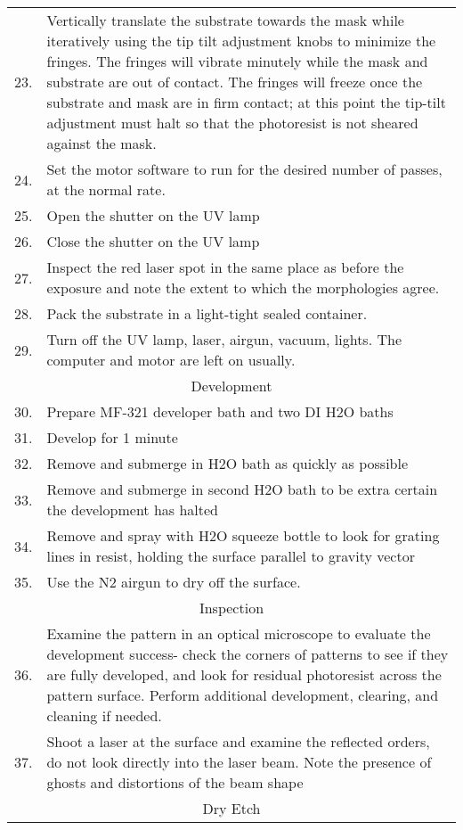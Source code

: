 \begin{longtable}{cp{15cm}}
23.&Vertically translate the substrate towards the mask while iteratively using the tip tilt adjustment knobs to minimize the fringes.  The fringes will vibrate minutely while the mask and substrate are out of contact.  The fringes will freeze once the substrate and mask are in firm contact; at this point the tip-tilt adjustment must halt so that the photoresist is not sheared against the mask.  \\
24.&Set the motor software to run for the desired number of passes, at the normal rate.\\
25.&Open the shutter on the UV lamp\\
26.&Close the shutter on the UV lamp\\
27.&Inspect the red laser spot in the same place as before the exposure and note the extent to which the morphologies agree.\\
28.&Pack the substrate in a light-tight sealed container.\\
29.&Turn off the UV lamp, laser, airgun, vacuum, lights.  The computer and motor are left on usually.\\
	\midrule
	\multicolumn{2}{c}{Development} \\
	\midrule
30.&Prepare MF-321 developer bath and two DI H2O baths\\
31.&Develop for 1 minute\\
32.&Remove and submerge in H2O bath as quickly as possible\\
33.&Remove and submerge in second H2O bath to be extra certain the development has halted\\
34.&Remove and spray with H2O squeeze bottle to look for grating lines in resist, holding the surface parallel to gravity vector\\
35.&Use the N2 airgun to dry off the surface.\\
	\midrule
	\multicolumn{2}{c}{Inspection} \\
	\midrule	
36.&Examine the pattern in an optical microscope to evaluate the development success- check the corners of patterns to see if they are fully developed, and look for residual photoresist across the pattern surface.  Perform additional development, clearing, and cleaning if needed.  \\
37.&Shoot a laser at the surface and examine the reflected orders, do not look directly into the laser beam.  Note the presence of ghosts and distortions of the beam shape  \\
	\midrule
	\multicolumn{2}{c}{Dry Etch} \\

\end{longtable}
